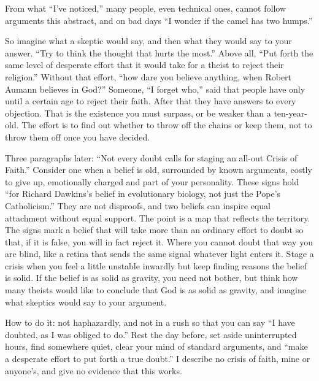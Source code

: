 From what ``I've noticed,'' many people, even technical ones, cannot follow arguments this abstract, and on bad days ``I wonder if the camel has two humps.'' 

So imagine what a skeptic would say, and then what they would say to your answer. ``Try to think the thought that hurts the most.'' Above all, ``Put forth the same level of desperate effort that it would take for a theist to reject their religion.'' Without that effort, ``how dare you believe anything, when Robert Aumann believes in God?'' Someone, ``I forget who,'' said that people have only until a certain age to reject their faith. After that they have answers to every objection. That is the existence you must surpass, or be weaker than a ten-year-old. The effort is to find out whether to throw off the chains or keep them, not to throw them off once you have decided.

Three paragraphs later: ``Not every doubt calls for staging an all-out Crisis of Faith.'' Consider one when a belief is old, surrounded by known arguments, costly to give up, emotionally charged and part of your personality. These signs hold ``for Richard Dawkins's belief in evolutionary biology, not just the Pope's Catholicism.'' They are not disproofs, and two beliefs can inspire equal attachment without equal support. The point is a map that reflects the territory. The signs mark a belief that will take more than an ordinary effort to doubt so that, if it is false, you will in fact reject it. Where you cannot doubt that way you are blind, like a retina that sends the same signal whatever light enters it. Stage a crisis when you feel a little unstable inwardly but keep finding reasons the belief is solid. If the belief is as solid as gravity, you need not bother, but think how many theists would like to conclude that God is as solid as gravity, and imagine what skeptics would say to your argument.

How to do it: not haphazardly, and not in a rush so that you can say ``I have doubted, as I was obliged to do.'' Rest the day before, set aside uninterrupted hours, find somewhere quiet, clear your mind of standard arguments, and ``make a desperate effort to put forth a true doubt.'' I describe no crisis of faith, mine or anyone's, and give no evidence that this works. 

